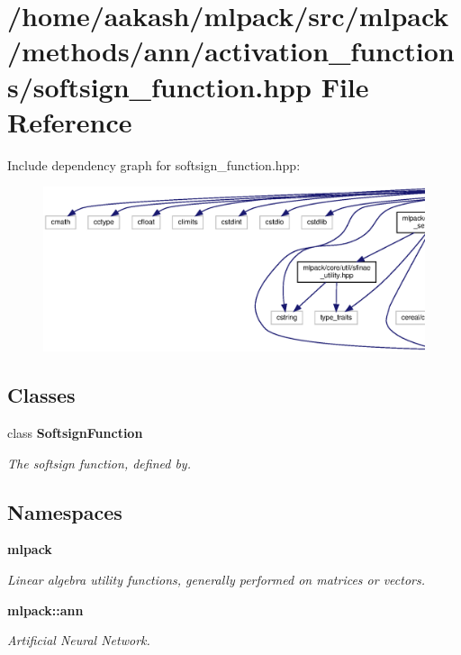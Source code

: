 \section{/home/aakash/mlpack/src/mlpack/methods/ann/activation\+\_\+functions/softsign\+\_\+function.hpp File Reference}
\label{softsign__function_8hpp}
Include dependency graph for softsign\+\_\+function.\+hpp\+:
\nopagebreak
\begin{figure}[H]
\begin{center}
\leavevmode
\includegraphics[width=350pt]{softsign__function_8hpp__incl}
\end{center}
\end{figure}
\subsection*{Classes}
\begin{DoxyCompactItemize}
\item 
class \textbf{ Softsign\+Function}
\begin{DoxyCompactList}\small\item\em The softsign function, defined by. \end{DoxyCompactList}\end{DoxyCompactItemize}
\subsection*{Namespaces}
\begin{DoxyCompactItemize}
\item 
 \textbf{ mlpack}
\begin{DoxyCompactList}\small\item\em Linear algebra utility functions, generally performed on matrices or vectors. \end{DoxyCompactList}\item 
 \textbf{ mlpack\+::ann}
\begin{DoxyCompactList}\small\item\em Artificial Neural Network. \end{DoxyCompactList}\end{DoxyCompactItemize}


